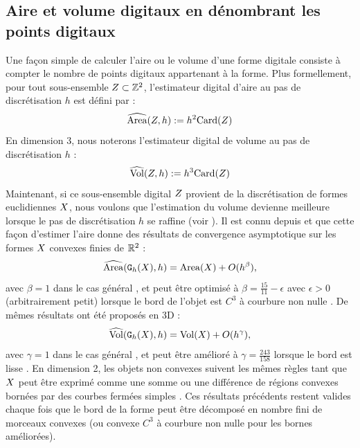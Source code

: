\subsection{Aire et volume digitaux en dénombrant les points digitaux}
\label{sec:AreaByCounting}
%
Une façon simple de calculer l'aire ou le volume d'une forme digitale consiste à
compter le nombre de points digitaux appartenant à la forme. Plus formellement,
pour tout sous-ensemble $Z \subset \mathbb{Z}^2$, l'estimateur digital d'aire au pas
de discrétisation $h$ est défini par :
%
\begin{equation}
  \widehat{\mathrm{Area}}(Z, h) := h^2 \mathrm{Card}(Z)
\end{equation}
%
En dimension $3$, nous noterons l'estimateur digital de volume au pas de
discrétisation $h$ :
%
\begin{equation}
  \widehat{\mathrm{Vol}}(Z, h) := h^3 \mathrm{Card}(Z)
\end{equation}
%
Maintenant, si ce sous-ensemble digital $Z$ provient de la discrétisation de
formes euclidiennes $X$, nous voulons que l'estimation du volume devienne
meilleure lorsque le pas de discrétisation $h$ se raffine (voir
). Il est connu depuis
 et  que cette façon d'estimer l'aire donne
des résultats de convergence asymptotique sur les formes $X$ convexes
finies de $\mathbb{R}^2$ :
%
\begin{equation}
  \label{eq:AreaByCountingConv}
  \widehat{\mathrm{Area}}(\mathtt{G}_{h}(X),h) = \mathrm{Area}(X) + O(h^\beta),
\end{equation}
%
avec $\beta = 1$ dans le cas général \cite{Klette2000}, et peut être optimisé à
$\beta = \frac{15}{11} - \epsilon$ avec $\epsilon > 0$ (arbitrairement petit)
lorsque le bord de l'objet est $C^3$ à courbure non nulle \cite{Huxley1990}.
De mêmes résultats ont été proposés en 3D :
%
\begin{equation}
  \label{eq:VolumeByCountingConv}
  \widehat{\mathrm{Vol}}(\mathtt{G}_{h}(X),h) = \mathrm{Vol}(X) + O(h^\gamma),
\end{equation}
%
avec $\gamma = 1$ dans le cas général \cite{Kratzel1988}, et peut être amélioré à
$\gamma=\frac{243}{158}$ lorsque le bord est lisse \cite{Guo2010}.
%
En dimension 2, les objets non convexes suivent les mêmes règles tant que
$X$ peut être exprimé comme une somme ou une différence de régions convexes
bornées par des courbes fermées simples \cite{Huxley1996}. Ces résultats
précédents restent valides chaque fois que le bord de la forme peut être
décomposé en nombre fini de morceaux convexes (ou convexe $C^3$ à courbure non
nulle pour les bornes améliorées).
%

